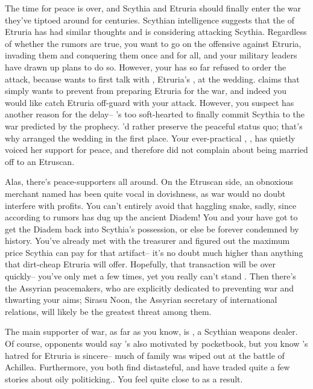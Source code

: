 \documentclass[char]{Kos}
\begin{document}
The time for peace is over, and Scythia and Etruria should finally enter the war they've tiptoed around for centuries. Scythian intelligence suggests that the \cEtruriaKing{\monarch} of Etruria has had similar thoughts and is considering attacking Scythia. Regardless of whether the rumors are true, you want to go on the offensive against Etruria, invading them and conquering them once and for all, and your military leaders have drawn up plans to do so. However, your \cScythiaKing{\spouse} has so far refused to order the attack, because \cScythiaKing{\they} wants to first talk with \cEtruriaKing{}, Etruria's \cEtruriaKing{\monarch}, at the wedding. \cScythiaKing{\They} claims that \cScythiaKing{\they} simply wants to prevent \cEtruriaKing{} from preparing Etruria for the war, and indeed you would like catch Etruria off-guard with your attack. However, you suspect \cScythiaKing{} has another reason for the delay-- \cScythiaKing{\they}'s too soft-hearted to finally commit Scythia to the war predicted by the prophecy. \cScythiaKing{\They}'d rather preserve the peaceful status quo; that's why \cScythiaKing{\they} arranged the wedding in the first place. Your ever-practical \cBride{\offspring}, \cBride{}, has quietly voiced her support for peace, and \cBride{\they} therefore did not complain about being married off to an Etruscan. 

Alas, there's peace-supporters all around. On the Etruscan side, an obnoxious merchant named \cMerchant{} has been quite vocal in \cMerchant{\their} dovishness, as war would no doubt interfere with \cMerchant{\their} profits. You can't entirely avoid that haggling snake, sadly, since according to rumors \cMerchant{\they} has dug up the ancient Diadem! You and your \cScythiaKing{\spouse} have got to get the Diadem back into Scythia's possession, or else be forever condemned by history. You've already met with the treasurer and figured out the maximum price Scythia can pay \cMerchant{} for that artifact-- it's no doubt much higher than anything that dirt-cheap Etruria will offer. Hopefully, that transaction will be over quickly-- you've only met \cMerchant{} a few times, yet you really can't stand \cMerchant{\them}. Then there's the Assyrian peacemakers, who are explicitly dedicated to preventing war and thwarting your aims; Sirasu Noon, the Assyrian secretary of international relations, will likely be the greatest threat among them.

The main supporter of war, as far as you know, is \cArmsDealer{}, a Scythian weapons dealer. Of course, \cArmsDealer{\their} opponents would say \cArmsDealer{\they}'s also motivated by \cArmsDealer{\their} pocketbook, but you know \cArmsDealer{}'s hatred for Etruria is sincere-- much of \cArmsDealer{\their} family was wiped out at the battle of Achillea. Furthermore, you both find \cMerchant{} distasteful, and have traded quite a few stories about \cMerchant{\their} oily politicking.. You feel quite close to \cArmsDealer{} as a result. 
\end{document}
